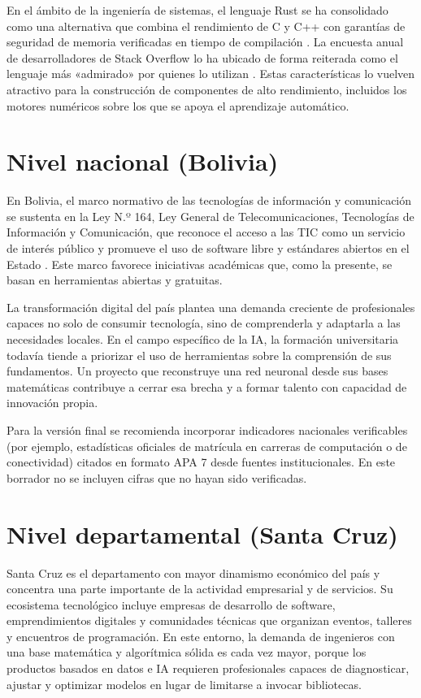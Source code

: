 En el ámbito de la ingeniería de sistemas, el lenguaje Rust se ha consolidado como una alternativa que combina el rendimiento de C y C++ con garantías de seguridad de memoria verificadas en tiempo de compilación \citep{matsakis2014,jung2018}. La encuesta anual de desarrolladores de Stack Overflow lo ha ubicado de forma reiterada como el lenguaje más «admirado» por quienes lo utilizan \citep{stackoverflow2024}. Estas características lo vuelven atractivo para la construcción de componentes de alto rendimiento, incluidos los motores numéricos sobre los que se apoya el aprendizaje automático.

\section{Nivel nacional (Bolivia)}
En Bolivia, el marco normativo de las tecnologías de información y comunicación se sustenta en la Ley N.º 164, Ley General de Telecomunicaciones, Tecnologías de Información y Comunicación, que reconoce el acceso a las TIC como un servicio de interés público y promueve el uso de software libre y estándares abiertos en el Estado \citep{bolivia2011}. Este marco favorece iniciativas académicas que, como la presente, se basan en herramientas abiertas y gratuitas.

La transformación digital del país plantea una demanda creciente de profesionales capaces no solo de consumir tecnología, sino de comprenderla y adaptarla a las necesidades locales. En el campo específico de la IA, la formación universitaria todavía tiende a priorizar el uso de herramientas sobre la comprensión de sus fundamentos. Un proyecto que reconstruye una red neuronal desde sus bases matemáticas contribuye a cerrar esa brecha y a formar talento con capacidad de innovación propia.

\begin{nota}
Para la versión final se recomienda incorporar indicadores nacionales verificables (por ejemplo, estadísticas oficiales de matrícula en carreras de computación o de conectividad) citados en formato APA 7 desde fuentes institucionales. En este borrador no se incluyen cifras que no hayan sido verificadas.
\end{nota}

\section{Nivel departamental (Santa Cruz)}
Santa Cruz es el departamento con mayor dinamismo económico del país y concentra una parte importante de la actividad empresarial y de servicios. Su ecosistema tecnológico incluye empresas de desarrollo de software, emprendimientos digitales y comunidades técnicas que organizan eventos, talleres y encuentros de programación. En este entorno, la demanda de ingenieros con una base matemática y algorítmica sólida es cada vez mayor, porque los productos basados en datos e IA requieren profesionales capaces de diagnosticar, ajustar y optimizar modelos en lugar de limitarse a invocar bibliotecas.

